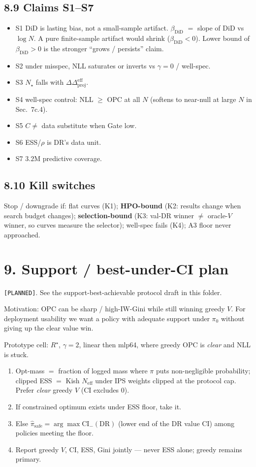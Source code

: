 \documentclass[11pt]{article}
\newcommand{\phonesection}[1]{\Needspace{8\baselineskip}\section*{#1}}
\newcommand{\phonesub}[1]{\Needspace{6\baselineskip}\subsection*{#1}}
\newcommand{\stag}[1]{\texttt{[#1]}}
\newcommand{\Rstar}{R^{\star}}
\newcommand{\DDprojeff}{\Delta\Delta_{\mathrm{proj}}^{\mathrm{eff}}}
\newcommand{\Neff}{N_{\mathrm{eff}}}
\begin{document}
\phonesub{8.9 Claims S1--S7}
\begin{itemize}
  \item S1 DiD is lasting bias, not a
        small-sample artifact.
        $\beta_{\mathrm{DiD}}$ $=$ slope of
        DiD vs $\log N$.  A pure
        finite-sample artifact would shrink
        ($\beta_{\mathrm{DiD}}<0$).
        Lower bound of $\beta_{\mathrm{DiD}}>0$
        is the stronger ``grows / persists''
        claim.
  \item S2 under misspec, NLL saturates or
        inverts vs $\gamma{=}0$ / well-spec.
  \item S3 $N_{\star}$ falls with
        $\DDprojeff$.
  \item S4 well-spec control: NLL $\ge$ OPC
        at all $N$ (softens to near-null at
        large $N$ in Sec.~7c.4).
  \item S5 $C\ne$ data substitute when Gate
        low.
  \item S6 ESS/$\rho$ is DR's data unit.
  \item S7 $3.2$M predictive coverage.
\end{itemize}

\phonesub{8.10 Kill switches}
Stop / downgrade if: flat curves (K1);
\textbf{HPO-bound} (K2: results change when
search budget changes); \textbf{selection-bound}
(K3: val-DR winner $\ne$ oracle-$V$ winner,
so curves measure the selector); well-spec
fails (K4); A3 floor never approached.

\phonesection{9. Support / best-under-CI plan}

\stag{PLANNED}. See the support-best-achievable
protocol draft in this folder.

Motivation: OPC can be sharp / high-IW-Gini
while still winning greedy $V$. For
deployment usability we want a policy with
adequate support under $\pi_{0}$ without
giving up the clear value win.

Prototype cell: $\Rstar$, $\gamma{=}2$,
linear then mlp64, where greedy OPC is
\emph{clear} and NLL is stuck.

\begin{enumerate}
  \item Opt-mass $=$ fraction of logged mass
        where $\pi$ puts non-negligible
        probability; clipped ESS $=$ Kish
        $\Neff$ under IPS weights clipped
        at the protocol cap. Prefer
        \emph{clear} greedy $V$ (CI excludes
        0).
  \item If constrained optimum exists under
        ESS floor, take it.
  \item Else
        $\hat\pi_{\mathrm{safe}}=
        \arg\max \mathrm{CI}_{-}(\mathrm{DR})$
        (lower end of the DR value CI)
        among policies meeting the floor.
  \item Report greedy $V$, CI, ESS, Gini
        jointly --- never ESS alone;
        greedy remains primary.
\end{enumerate}
\end{document}
